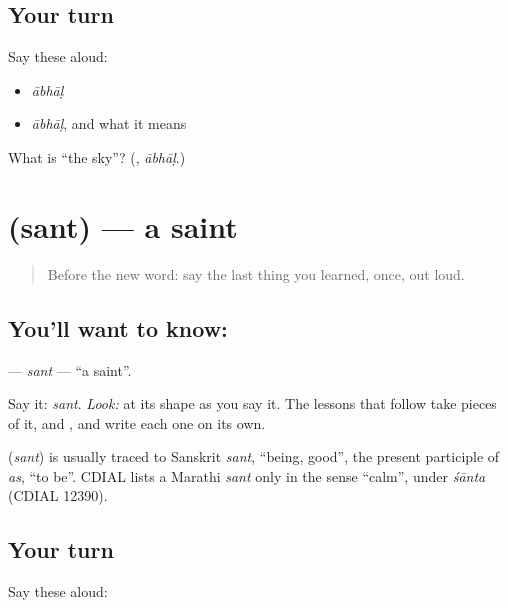 \subsection*{Your turn}
Say these aloud:

\begin{itemize}
\raggedright
  \item \emph{ābhāḷ}
  \item \emph{ābhāḷ}, and what it means
\end{itemize}

\begin{tcolorbox}[breakable,colback=teal!4,colframe=teal!35!black,title={Before you move on}]
What is \textquotedblleft{}the sky\textquotedblright{}? (\textbf{}, \emph{ābhāḷ}.)
\end{tcolorbox}
\section[\texorpdfstring{\mr{संत} (sant)}{संत (sant)}]{ (sant) — a saint}

\label{lesson:MR-C02-sant}



\begin{quote}
Before the new word: say the last thing you learned, once, out loud.
\end{quote}

\subsection*{You'll want to know: }
\textbf{} — \emph{sant} — \textquotedblleft{}a saint\textquotedblright{}.

Say it: \emph{sant}. \emph{Look:} at its shape as you say it. The lessons that follow take pieces of it, \textbf{} and \textbf{}, and write each one on its own.

\begin{cousinweb}
\textbf{} (\emph{sant}) is usually traced to Sanskrit \emph{sant}, \textquotedblleft{}being, good\textquotedblright{}, the present participle of \emph{as}, \textquotedblleft{}to be\textquotedblright{}. CDIAL lists a Marathi \emph{sant} only in the sense \textquotedblleft{}calm\textquotedblright{}, under \emph{śānta} (CDIAL 12390).
\end{cousinweb}

\subsection*{Your turn}
Say these aloud:

